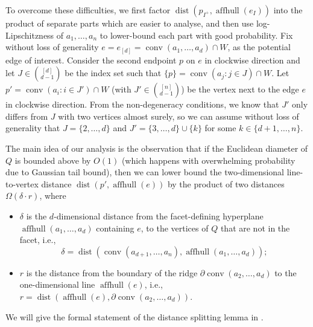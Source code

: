 \documentclass{article}\usepackage[a4paper,margin=20mm]{geometry}
\newcommand{\aff}{\operatorname{affhull}}
\newcommand{\conv}{\operatorname{conv}}
\newcommand{\dist}{\operatorname{dist}}
\begin{document}
To overcome these difficulties, we first factor $\dist(p_{I^+}, \aff(e_I))$ into the product
of separate parts which are easier to analyse, and then use log-Lipschitzness of $a_1, \ldots, a_n$ to lower-bound each part with good probability.
Fix without loss of generality $e = e_{[d]} = \conv(a_1, \ldots, a_d) \cap W$, as the potential edge of interest. 
Consider the second endpoint $p$ on $e$ in
clockwise direction and let $J \in \binom{[d]}{d-1}$ be the index set
such that $\{p\} = \conv(a_j : j \in J) \cap W$.
Let $p' = \conv(a_i : i \in J') \cap
W$ (with $J' \in \binom{[n]}{d-1}$) be the vertex next to the edge $e$ in clockwise direction.
From the non-degeneracy conditions, we know that $J'$ only differs from $J$ with
two vertices almost surely, so we can assume without loss of generality that $J
= \{2, \ldots, {d}\}$ and $J' = \{3, \ldots, d\} \cup \{k\}$ for some
$k \in \{d+1, \ldots, n\}$.

The main idea of our analysis is the observation that if the Euclidean diameter of $Q$ is
bounded above by $O(1)$ (which happens with overwhelming probability due to
Gaussian tail bound), then we can lower bound the two-dimensional line-to-vertex
distance $\dist(p', \aff(e))$ by the product of two distances $\Omega(\delta \cdot r)$, where
\begin{itemize}
    \item $\delta$ is the $d$-dimensional distance from the facet-defining hyperplane $\aff(a_1, \ldots, a_d)$ containing $e$, to the vertices of $Q$ that are not in the facet, i.e., 
    $$\delta = \dist(\conv(a_{d+1}, \ldots, a_n), \aff(a_1, \ldots, a_d));$$
    \item $r$ is the distance from the boundary of the ridge $\partial \conv(a_2, \ldots, a_d)$ to the one-dimensional line $\aff(e)$, i.e., $r = \dist(\aff(e), \partial \conv(a_2, \ldots, a_d))$.
\end{itemize}
We will give the formal statement of the distance splitting lemma in .

\end{document}
